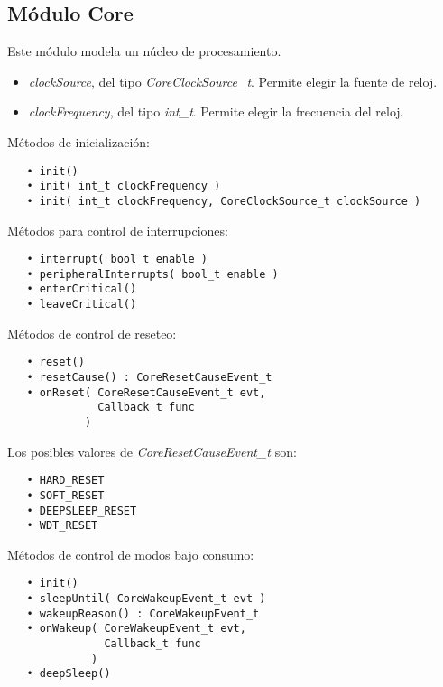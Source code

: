 \subsection{Módulo Core}

Este módulo modela un núcleo de procesamiento.


\begin{itemize}
\item
\emph{clockSource}, del tipo \emph{CoreClockSource\_t}. Permite elegir la fuente de reloj.
\item
\emph{clockFrequency}, del tipo \emph{int\_t}. Permite elegir la frecuencia del reloj.
\end{itemize}


Métodos de inicialización:

\begin{verbatim}
   • init()
   • init( int_t clockFrequency )
   • init( int_t clockFrequency, CoreClockSource_t clockSource )
\end{verbatim} 

Métodos para control de interrupciones:

\begin{verbatim}
   • interrupt( bool_t enable )
   • peripheralInterrupts( bool_t enable )
   • enterCritical()
   • leaveCritical()
\end{verbatim}  

Métodos de control de reseteo:

\begin{verbatim}
   • reset()
   • resetCause() : CoreResetCauseEvent_t
   • onReset( CoreResetCauseEvent_t evt,
              Callback_t func
            )
\end{verbatim}

Los posibles valores de \emph{CoreResetCauseEvent\_t} son:

\begin{verbatim}
   • HARD_RESET
   • SOFT_RESET
   • DEEPSLEEP_RESET
   • WDT_RESET
\end{verbatim} 

Métodos de control de modos bajo consumo:

\begin{verbatim}
   • init()
   • sleepUntil( CoreWakeupEvent_t evt )
   • wakeupReason() : CoreWakeupEvent_t
   • onWakeup( CoreWakeupEvent_t evt,
               Callback_t func
             )
   • deepSleep()
\end{verbatim}  

